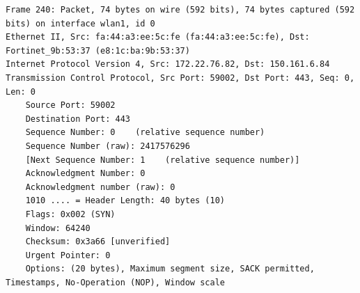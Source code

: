
\begin{solution}
\begin{verbatim}
Frame 240: Packet, 74 bytes on wire (592 bits), 74 bytes captured (592 bits) on interface wlan1, id 0
Ethernet II, Src: fa:44:a3:ee:5c:fe (fa:44:a3:ee:5c:fe), Dst: Fortinet_9b:53:37 (e8:1c:ba:9b:53:37)
Internet Protocol Version 4, Src: 172.22.76.82, Dst: 150.161.6.84
Transmission Control Protocol, Src Port: 59002, Dst Port: 443, Seq: 0, Len: 0
    Source Port: 59002
    Destination Port: 443
    Sequence Number: 0    (relative sequence number)
    Sequence Number (raw): 2417576296
    [Next Sequence Number: 1    (relative sequence number)]
    Acknowledgment Number: 0
    Acknowledgment number (raw): 0
    1010 .... = Header Length: 40 bytes (10)
    Flags: 0x002 (SYN)
    Window: 64240
    Checksum: 0x3a66 [unverified]
    Urgent Pointer: 0
    Options: (20 bytes), Maximum segment size, SACK permitted, Timestamps, No-Operation (NOP), Window scale
\end{verbatim}
\end{solution}